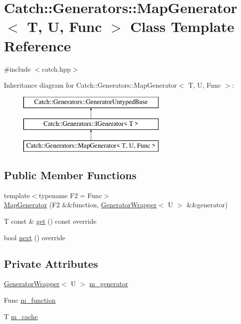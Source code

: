 \hypertarget{class_catch_1_1_generators_1_1_map_generator}{}\section{Catch\+::Generators\+::Map\+Generator$<$ T, U, Func $>$ Class Template Reference}
\label{class_catch_1_1_generators_1_1_map_generator}


{\ttfamily \#include $<$catch.\+hpp$>$}

Inheritance diagram for Catch\+::Generators\+::Map\+Generator$<$ T, U, Func $>$\+:\begin{figure}[H]
\begin{center}
\leavevmode
\includegraphics[height=3.000000cm]{class_catch_1_1_generators_1_1_map_generator}
\end{center}
\end{figure}
\subsection*{Public Member Functions}
\begin{DoxyCompactItemize}
\item 
{\footnotesize template$<$typename F2  = Func$>$ }\\\mbox{\hyperlink{class_catch_1_1_generators_1_1_map_generator_a525c7eaf53ad220ee7add534aff2522c}{Map\+Generator}} (F2 \&\&function, \mbox{\hyperlink{class_catch_1_1_generators_1_1_generator_wrapper}{Generator\+Wrapper}}$<$ U $>$ \&\&generator)
\item 
T const  \& \mbox{\hyperlink{class_catch_1_1_generators_1_1_map_generator_a199d377afba00519f202c59b4b488235}{get}} () const override
\item 
bool \mbox{\hyperlink{class_catch_1_1_generators_1_1_map_generator_aa07e2f12d38ae060c30cc30d9dc236c5}{next}} () override
\end{DoxyCompactItemize}
\subsection*{Private Attributes}
\begin{DoxyCompactItemize}
\item 
\mbox{\hyperlink{class_catch_1_1_generators_1_1_generator_wrapper}{Generator\+Wrapper}}$<$ U $>$ \mbox{\hyperlink{class_catch_1_1_generators_1_1_map_generator_a7a4c986b7721df82559d5c3cbb3bdb66}{m\+\_\+generator}}
\item 
Func \mbox{\hyperlink{class_catch_1_1_generators_1_1_map_generator_add8fa24bfa56705c798fe70f4c6235ff}{m\+\_\+function}}
\item 
T \mbox{\hyperlink{class_catch_1_1_generators_1_1_map_generator_a970d45e8dccf903d3539daada255da42}{m\+\_\+cache}}
\end{DoxyCompactItemize}
